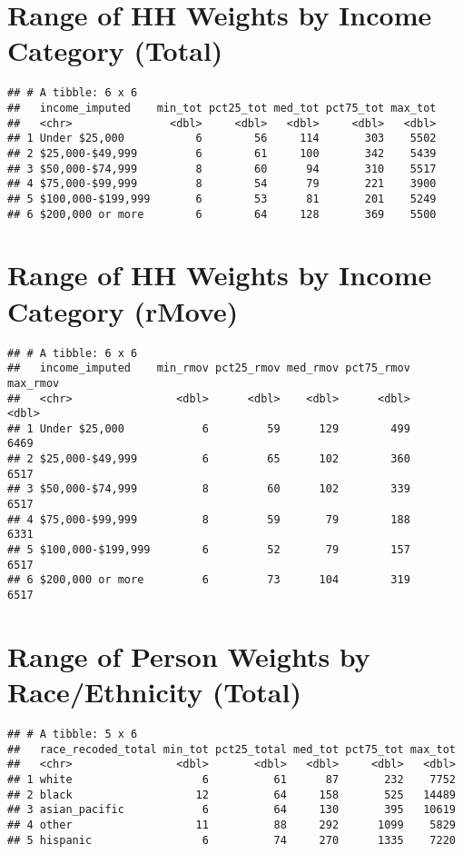 \documentclass[
]{article}
\begin{document}
\section{Range of HH Weights by Income Category
(Total)}\label{range-of-hh-weights-by-income-category-total}

\begin{verbatim}
## # A tibble: 6 x 6
##   income_imputed    min_tot pct25_tot med_tot pct75_tot max_tot
##   <chr>               <dbl>     <dbl>   <dbl>     <dbl>   <dbl>
## 1 Under $25,000           6        56     114       303    5502
## 2 $25,000-$49,999         6        61     100       342    5439
## 3 $50,000-$74,999         8        60      94       310    5517
## 4 $75,000-$99,999         8        54      79       221    3900
## 5 $100,000-$199,999       6        53      81       201    5249
## 6 $200,000 or more        6        64     128       369    5500
\end{verbatim}

\section{Range of HH Weights by Income Category
(rMove)}\label{range-of-hh-weights-by-income-category-rmove}

\begin{verbatim}
## # A tibble: 6 x 6
##   income_imputed    min_rmov pct25_rmov med_rmov pct75_rmov max_rmov
##   <chr>                <dbl>      <dbl>    <dbl>      <dbl>    <dbl>
## 1 Under $25,000            6         59      129        499     6469
## 2 $25,000-$49,999          6         65      102        360     6517
## 3 $50,000-$74,999          8         60      102        339     6517
## 4 $75,000-$99,999          8         59       79        188     6331
## 5 $100,000-$199,999        6         52       79        157     6517
## 6 $200,000 or more         6         73      104        319     6517
\end{verbatim}

\section{Range of Person Weights by Race/Ethnicity
(Total)}\label{range-of-person-weights-by-raceethnicity-total}

\begin{verbatim}
## # A tibble: 5 x 6
##   race_recoded_total min_tot pct25_total med_tot pct75_tot max_tot
##   <chr>                <dbl>       <dbl>   <dbl>     <dbl>   <dbl>
## 1 white                    6          61      87       232    7752
## 2 black                   12          64     158       525   14489
## 3 asian_pacific            6          64     130       395   10619
## 4 other                   11          88     292      1099    5829
## 5 hispanic                 6          74     270      1335    7220
\end{verbatim}
\end{document}
